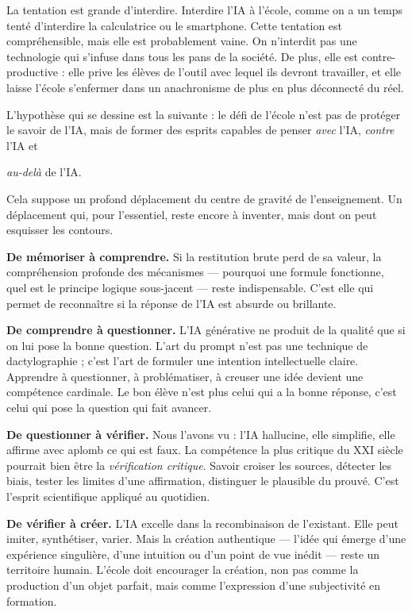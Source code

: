 La tentation est grande d'interdire. Interdire l'IA à l'école, comme on a un temps tenté d'interdire la calculatrice ou le smartphone. Cette tentation est compréhensible, mais elle est probablement vaine. On n'interdit pas une technologie qui s'infuse dans tous les pans de la société. De plus, elle est contre-productive : elle prive les élèves de l'outil avec lequel ils devront travailler, et elle laisse l'école s'enfermer dans un anachronisme de plus en plus déconnecté du réel.

L'hypothèse qui se dessine est la suivante : le défi de l'école n'est pas de protéger le savoir de l'IA, mais de former des esprits capables de penser \emph{avec} l'IA, \emph{contre} l'IA et

\emph{au-delà} de l'IA.

Cela suppose un profond déplacement du centre de gravité de l'enseignement. Un déplacement qui, pour l'essentiel, reste encore à inventer, mais dont on peut esquisser les contours.

\textbf{De mémoriser à comprendre.} Si la restitution brute perd de sa valeur, la compréhension profonde des mécanismes — pourquoi une formule fonctionne, quel est le principe logique sous-jacent — reste indispensable. C'est elle qui permet de reconnaître si la réponse de l'IA est absurde ou brillante.

\textbf{De comprendre à questionner.} L'IA générative ne produit de la qualité que si on lui pose la bonne question. L'art du prompt n'est pas une technique de dactylographie ; c'est l'art de formuler une intention intellectuelle claire. Apprendre à questionner, à problématiser, à creuser une idée devient une compétence cardinale. Le bon élève n'est plus celui qui a la bonne réponse, c'est celui qui pose la question qui fait avancer.

\textbf{De questionner à vérifier.} Nous l'avons vu : l'IA hallucine, elle simplifie, elle affirme avec aplomb ce qui est faux. La compétence la plus critique du XXI siècle pourrait bien être la \emph{vérification critique}. Savoir croiser les sources, détecter les biais, tester les limites d'une affirmation, distinguer le plausible du prouvé. C'est l'esprit scientifique appliqué au quotidien.

\textbf{De vérifier à créer.} L'IA excelle dans la recombinaison de l'existant. Elle peut imiter, synthétiser, varier. Mais la création authentique — l'idée qui émerge d'une expérience singulière, d'une intuition ou d'un point de vue inédit — reste un territoire humain. L'école doit encourager la création, non pas comme la production d'un objet parfait, mais comme l'expression d'une subjectivité en formation.

